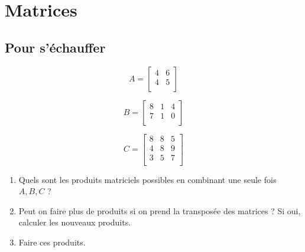 \documentclass[a4paper]{article}\usepackage[]{graphicx}\usepackage[]{xcolor}
\begin{document}
\section*{Matrices}

\subsection*{Pour s'échauffer}

\begin{minipage}{0.33\linewidth}
    \begin{equation*}
        A = \begin{bmatrix} 4 &6 \\4 &5 \\ \end{bmatrix}
    \end{equation*}
\end{minipage}
\begin{minipage}{0.33\linewidth}
    \begin{equation*}
        B = \begin{bmatrix} 8 &1 &4 \\7 &1 &0 \\ \end{bmatrix}
    \end{equation*}
\end{minipage}
\begin{minipage}{0.33\linewidth}
    \begin{equation*}
        C = \begin{bmatrix} 8 &8 &5 \\4 &8 &9 \\3 &5 &7 \\ \end{bmatrix}
    \end{equation*}
\end{minipage}

\begin{enumerate}
    \item Quels sont les produits matriciels possibles en combinant une seule 
    fois $A, B, C$ ? 
    \item Peut on faire plus de produits si on prend la 
    transposée des matrices ? Si oui, calculer les nouveaux produits.
    \item Faire ces produits.
\end{enumerate}
\end{document}
